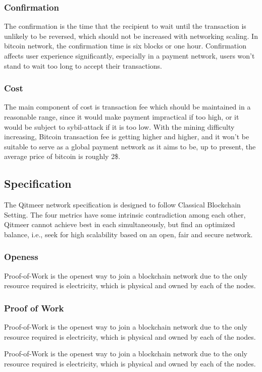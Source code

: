 \documentclass[a4paper,11pt]{article}
\begin{document}
\subsubsection*{Confirmation}
The confirmation is the time that the recipient to wait until the transaction is unlikely to be reversed, which should not be increased with networking scaling. In bitcoin network, the confirmation time is six blocks or one hour.  Confirmation affects user experience significantly, especially in a payment network, users won’t stand to wait too long to accept their transactions.
\subsubsection*{Cost}
The main component of cost is transaction fee which should be maintained in a  reasonable range, since it would make payment impractical if too high, or it would be subject to sybil-attack if it is too low. With the mining difficulty increasing, Bitcoin transaction fee is getting higher and higher, and it won’t be suitable to serve as a global payment network as it aims to be, up to present, the average price of bitcoin is roughly 2\$. 

\subsection{Specification}
The Qitmeer network specification is designed to follow Classical Blockchain Setting. The four metrics have some intrinsic contradiction among each other, Qitmeer cannot achieve best in each simultaneously, but find an optimized balance, i.e., seek for high scalability based on an open, fair and secure network.
\subsubsection{Openess}
Proof-of-Work is the openest way to join a blockchain network due to the only resource required is electricity, which is physical and owned by each of the nodes.  
\subsubsection*{Proof of Work}
Proof-of-Work is the openest way to join a blockchain network due to the only resource required is electricity, which is physical and owned by each of the nodes.  

Proof-of-Work is the openest way to join a blockchain network due to the only resource required is electricity, which is physical and owned by each of the nodes.  
\end{document}
